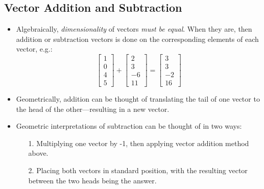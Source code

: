 \begin{itemize}
  \subsection{Vector Addition and Subtraction}\label{Vector Addition and Subtraction}
  \begin{itemize}
      \item Algebraically, \emph{dimensionality} of vectors \emph{must be equal}. When they are, then addition or subtraction vectors is done on the corresponding elements of each vector, e.g.:
      \[%
      \begin{bmatrix}
      1 \\
      0 \\
      4 \\
      5 
      \end{bmatrix}
      +
      \begin{bmatrix}
      2 \\
      3 \\
      -6 \\
      11
      \end{bmatrix}
      =
      \begin{bmatrix}
      3 \\
      3 \\
      -2 \\
      16
      \end{bmatrix}
      \]%
      \item Geometrically, addition can be thought of translating the tail of one vector to the head of the other---resulting in a new vector. 
      \item Geometric interpretations of subtraction can be thought of in two ways:
        \begin{itemize}
          \item[1.] Multiplying one vector by -1, then applying vector addition method above.
          \item[2.] Placing both vectors in standard position, with the resulting vector between the two heads being the answer.
        \end{itemize}
  \end{itemize}
  

\end{itemize}
